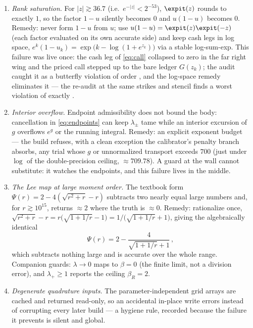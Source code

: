 \begin{enumerate}[leftmargin=1.6em]
\item \emph{Rank saturation.}  For $|z|\gtrsim36.7$ (i.e.\
$e^{-|z|}<2^{-53}$), $\expit(z)$ rounds to exactly $1$, so the factor
$1-u$ silently becomes $0$ and $u(1-u)$ becomes $0$.  Remedy: never form
$1-u$ from $u$; use $u(1-u)=\expit(z)\expit(-z)$ (each factor evaluated
on its own accurate side) and keep cash legs in log space,
$e^{k}(1-u_k)=\exp\!\big(k-\log(1+e^{z_k})\big)$ via a stable
log-sum-exp.  This failure was live once: the cash leg of
\eqref{eq:call} collapsed to zero in the far right wing and the priced
call stepped up to the bare ledger $G(z_k)$; the audit caught it as a
butterfly violation of order \MacAuditPreFixFly, and the log-space
remedy eliminates it --- the re-audit at the same strikes and stencil
finds a worst violation of exactly \MacAuditPostFixFly.
\item \emph{Interior overflow.}  Endpoint admissibility does not bound
the body: cancellation in \eqref{eq:endpoints} can keep $\lambda_\pm$
tame while an interior excursion of $g$ overflows $e^{g}$ or the running
integral.  Remedy: an explicit exponent budget --- the build refuses,
with a clean exception the calibrator's penalty branch absorbs, any
trial whose $g$ or unnormalized transport exceeds $700$ (just under
$\log$ of the double-precision ceiling, $\approx709.78$).  A guard at
the wall cannot substitute: it watches the endpoints, and this failure
lives in the middle.
\item \emph{The Lee map at large moment order.}  The textbook form
$\Psi(r)=2-4(\sqrt{r^{2}+r}-r)$ subtracts two nearly equal large numbers
and, for $r\gtrsim10^{15}$, returns $\approx2$ where the truth is
$\approx0$.  Remedy: rationalize once,
$\sqrt{r^{2}+r}-r=r\big(\sqrt{1+1/r}-1\big)=1/\big(\sqrt{1+1/r}+1\big)$,
giving the algebraically identical
\begin{equation}
\Psi(r)=2-\frac{4}{\sqrt{1+1/r}+1}\,,
\label{eq:leestable}
\end{equation}
which subtracts nothing large and is accurate over the whole range.  Companion guards:
$\lambda\to0$ maps to $\beta=0$ (the finite limit, not a division
error), and $\lambda_+\ge1$ reports the ceiling $\beta_R=2$.
\item \emph{Degenerate quadrature inputs.}  The parameter-independent
grid arrays are cached and returned read-only, so an accidental in-place
write errors instead of corrupting every later build --- a hygiene rule,
recorded because the failure it prevents is silent and global.
\end{enumerate}

